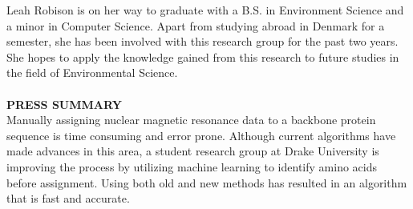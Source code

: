 \documentclass{article}
\begin{document}
Leah Robison is on her way to graduate with a B.S. in Environment Science and a minor in Computer Science. Apart from studying abroad in Denmark for a semester, she has been involved with this research group for the past two years. She hopes to apply the knowledge gained from this research to future studies in the field of Environmental Science.
\\\\
\noindent\textbf{PRESS SUMMARY}\\
Manually assigning nuclear magnetic resonance data to a backbone protein sequence is time consuming and error prone. Although current algorithms have made advances in this area, a student research group at Drake University is improving the process by utilizing machine learning to identify amino acids before assignment. Using both old and new methods has resulted in an algorithm that is fast and accurate. 
\end{document}
